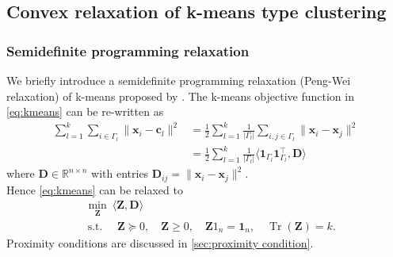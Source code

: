 		


		
			


	\subsection{Convex relaxation of k-means type clustering}
		\subsubsection*{Semidefinite programming relaxation}
			We briefly introduce a semidefinite programming relaxation (Peng-Wei relaxation) of k-means proposed by \citet{Peng2005}.
			The k-means objective function in \eqref{eq:kmeans} can be re-written as
			\begin{align*}
			\sum_{l=1}^k\sum_{i\in\Gamma_l}\|\mathbf{x}_i- \mathbf{c}_l\|^2 &= \frac{1}{2}\sum_{l=1}^k \frac{1}{|\Gamma_l|}\sum_{i,j\in\Gamma_l}\|\mathbf{x}_i - \mathbf{x}_j\|^2\\
			&= \frac{1}{2}\sum_{l=1}^k\frac{1}{|\Gamma_l|}\langle \mathbf{1}_{\Gamma_l}\mathbf{1}_{\Gamma_l}^\top,\mathbf{D} \rangle
			\end{align*}
			where $\mathbf{D}\in \mathbb{R}^{n\times n}$ with entries $\mathbf{D}_{ij}=\|\mathbf{x}_i- \mathbf{x}_j\|^2$.
			\\
			Hence \eqref{eq:kmeans} can be relaxed to
			\begin{align*}
			&\min_{\mathbf{Z}}\ \langle \mathbf{Z},\mathbf{D}\rangle \qquad \\
			& \ \text{s.t. } \quad \mathbf{Z} \succeq 0, \quad \mathbf{Z} \geq 0, \quad \mathbf{Z} 1_{n}=\mathbf{1}_{n}, \quad \operatorname{Tr}(\mathbf{Z})=k.
			\end{align*}
		Proximity conditions are discussed in \ref{sec:proximity condition}.
		

